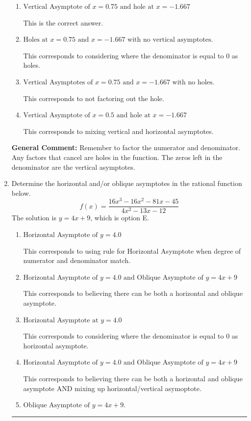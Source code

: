 \documentclass{extbook}[14pt]
\newcommand{\litem}[1]{\item #1

\rule{\textwidth}{0.4pt}}
\begin{document}
\begin{enumerate}
{\begin{enumerate}[label=\Alph*.]
This corresponds to setting the numerator equal to 0.
\item \( \text{Vertical Asymptote of } x = 0.75 \text{ and hole at } x = -1.667 \)

This is the correct answer.
\item \( \text{Holes at } x = 0.75 \text{ and } x = -1.667 \text{ with no vertical asymptotes.} \)

This corresponds to considering where the denominator is equal to 0 as holes.
\item \( \text{Vertical Asymptotes of } x = 0.75 \text{ and } x = -1.667 \text{ with no holes.} \)

This corresponds to not factoring out the hole.
\item \( \text{Vertical Asymptote of } x = 0.5 \text{ and hole at } x = -1.667 \)

This corresponds to mixing vertical and horizontal asymptotes.
\end{enumerate}

\textbf{General Comment:} Remember to factor the numerator and denominator. Any factors that cancel are holes in the function. The zeros left in the denominator are the vertical asymptotes.
}
\litem{
Determine the horizontal and/or oblique asymptotes in the rational function below.
\[ f(x) = \frac{16x^{3} -16 x^{2} -81 x -45}{4x^{2} -13 x -12} \]The solution is \( y = 4x + 9 \), which is option E.\begin{enumerate}[label=\Alph*.]
\item \( \text{Horizontal Asymptote of } y = 4.0  \)

This corresponds to using rule for Horizontal Asymptote when degree of numerator and denominator match.
\item \( \text{Horizontal Asymptote of } y = 4.0 \text{ and Oblique Asymptote of } y = 4x + 9 \)

This corresponds to believing there can be both a horizontal and oblique asymptote.
\item \( \text{Horizontal Asymptote at } y = 4.0 \)

This corresponds to considering where the denominator is equal to 0 as horizontal asymptote.
\item \( \text{Horizontal Asymptote of } y = 4.0 \text{ and Oblique Asymptote of } y = 4x + 9 \)

This corresponds to believing there can be both a horizontal and oblique asymptote AND mixing up horizontal/vertical asymoptote.
\item \( \text{Oblique Asymptote of } y = 4x + 9. \)


\end{enumerate}}
\end{enumerate}
\end{document}

